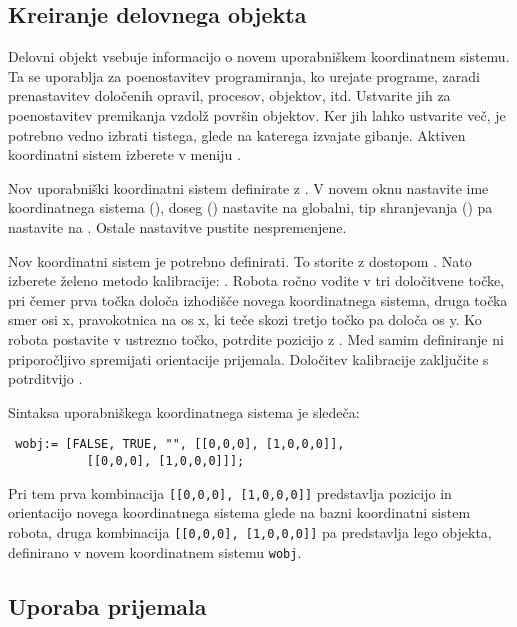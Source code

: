 \subsection{Kreiranje delovnega objekta}

Delovni objekt vsebuje informacijo o novem uporabniškem koordinatnem sistemu. Ta se uporablja za poenostavitev programiranja, ko urejate programe, zaradi prenastavitev določenih opravil, procesov, objektov, itd. Ustvarite jih za poenostavitev premikanja vzdolž površin objektov. Ker jih lahko ustvarite več, je potrebno vedno izbrati tistega, glede na katerega izvajate gibanje. Aktiven koordinatni sistem izberete v meniju .

Nov uporabniški koordinatni sistem definirate z . V novem oknu nastavite ime koordinatnega sistema (), doseg () nastavite na globalni, tip shranjevanja () pa nastavite na . Ostale nastavitve pustite nespremenjene.

Nov koordinatni sistem je potrebno definirati. To storite z dostopom . Nato izberete želeno metodo kalibracije: . Robota ročno vodite v tri določitvene točke, pri čemer prva točka določa izhodišče novega koordinatnega sistema, druga točka smer osi x, pravokotnica na os x, ki teče skozi tretjo točko pa določa os y. Ko robota postavite v ustrezno točko, potrdite pozicijo z . Med samim definiranje ni priporočljivo spremijati orientacije prijemala. Določitev kalibracije zaključite s potrditvijo .


Sintaksa uporabniškega koordinatnega sistema je sledeča:

\begin{verbatim}
 wobj:= [FALSE, TRUE, "", [[0,0,0], [1,0,0,0]],
           [[0,0,0], [1,0,0,0]]];
\end{verbatim}

Pri tem prva kombinacija \verb"[[0,0,0], [1,0,0,0]]" predstavlja pozicijo in orientacijo novega koordinatnega sistema glede na bazni koordinatni sistem robota, druga kombinacija \verb"[[0,0,0], [1,0,0,0]]" pa predstavlja lego objekta, definirano v novem koordinatnem sistemu \verb"wobj".

\subsection{Uporaba prijemala}

